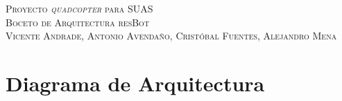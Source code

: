 \documentclass[letterpaper,11pt]{article}
\begin{document}
\begin{center}
\vspace{-0.2cm}
\noindent\makebox[\linewidth]{\rule{\textwidth}{0.4pt}}
\vspace{0.2cm}
\textsc{Proyecto \textit{quadcopter} para SUAS }\\
\vspace{0.1cm}
\huge{\textsc{Boceto de Arquitectura resBot}}\\
\vspace{0.4cm}
\normalsize{\textsc{Vicente Andrade, Antonio Avendaño, Cristóbal Fuentes, Alejandro Mena}}
\vspace{-0.2cm}\\
\noindent\makebox[\linewidth]{\rule{\textwidth}{0.4pt}}
\end{center}

\vspace{1cm}

\section*{Diagrama de Arquitectura}

\vspace{0.5cm}
\end{document}
